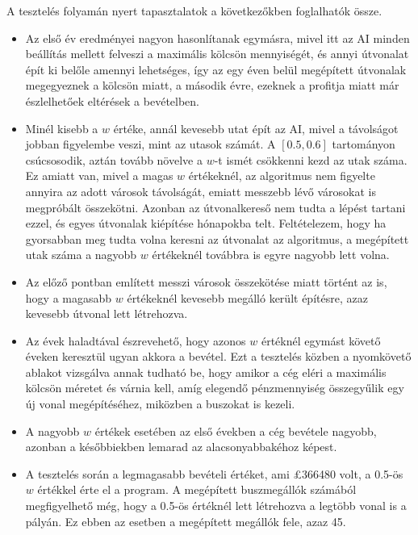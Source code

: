 A tesztelés folyamán nyert tapasztalatok a következőkben foglalhatók össze.
\begin{itemize}
	\item Az első év eredményei nagyon hasonlítanak egymásra, mivel itt az AI minden beállítás mellett felveszi a maximális kölcsön mennyiségét, és annyi útvonalat épít ki belőle amennyi lehetséges, így az egy éven belül megépített útvonalak megegyeznek a kölcsön miatt, a második évre, ezeknek a profitja miatt már észlelhetőek eltérések a bevételben.
	\item Minél kisebb a $w$ értéke, annál kevesebb utat épít az AI, mivel a távolságot jobban figyelembe veszi, mint az utasok számát. A $[0.5, 0.6]$ tartományon csúcsosodik, aztán tovább növelve a $w$-t ismét csökkenni kezd az utak száma. Ez amiatt van, mivel a magas $w$ értékeknél, az algoritmus nem figyelte annyira az adott városok távolságát, emiatt messzebb lévő városokat is megpróbált összekötni. Azonban az útvonalkereső nem tudta a lépést tartani ezzel, és egyes útvonalak kiépítése hónapokba telt. Feltételezem, hogy ha gyorsabban meg tudta volna keresni az útvonalat az algoritmus, a megépített utak száma a nagyobb $w$ értékeknél továbbra is egyre nagyobb lett volna.
	\item Az előző pontban említett messzi városok összekötése miatt történt az is, hogy a magasabb $w$ értékeknél kevesebb megálló került építésre, azaz kevesebb útvonal lett létrehozva.
	\item Az évek haladtával észrevehető, hogy azonos $w$ értéknél egymást követő éveken keresztül ugyan akkora a bevétel. Ezt a tesztelés közben a nyomkövető ablakot vizsgálva annak tudható be, hogy amikor a cég eléri a maximális kölcsön méretet és várnia kell, amíg elegendő pénzmennyiség összegyűlik egy új vonal megépítéséhez, miközben a buszokat is kezeli.
	\item A nagyobb $w$ értékek esetében az első években a cég bevétele nagyobb, azonban a későbbiekben lemarad az alacsonyabbakéhoz képest.
	\item A tesztelés során a legmagasabb bevételi értéket, ami \pounds 366480 volt, a 0.5-ös $w$ értékkel érte el a program. A megépített buszmegállók számából megfigyelhető még, hogy a 0.5-ös értéknél lett létrehozva a legtöbb vonal is a pályán. Ez ebben az esetben a megépített megállók fele, azaz 45.
\end{itemize}

